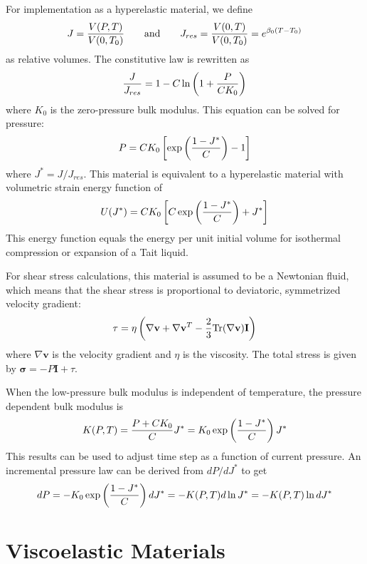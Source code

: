 \documentclass[11pt]{book}
\begin{document}
For implementation as a hyperelastic material, we define
\begin{equation}
 J = {V(P,T)\over V(0,T_0)} \qquad {\rm and} \qquad J_{res} = {V(0,T)\over V(0,T_0)} = e^{\beta_0(T-T_0)}
\end{equation}
as relative volumes. The constitutive law is rewritten as
\begin{equation}
     {J\over J_{res}} = 1-C\ln\left(1+{P\over CK_0}\right)
\end{equation}
where $K_0$ is the zero-pressure bulk modulus. This equation can be solved for pressure:
\begin{equation}
    P = CK_0\left[\exp\left(1 - J^*\over C\right)-1\right]
\end{equation}
where $J^*=J/J_{res}$. This material is equivalent to a hyperelastic material with volumetric strain energy function of
\begin{equation}
        U(J^*) = C K_0\left[ C \exp\left({1-J^*\over C}\right) + J^*\right]
\end{equation}
This energy function equals the energy per unit initial volume for isothermal compression or expansion of a Tait liquid.

For shear stress calculations, this material is assumed to be a Newtonian fluid, which means that the shear stress is proportional to deviatoric, symmetrized velocity gradient:
\begin{equation}
    \tau = \eta \left(\nabla \mathbf{v} + \nabla \mathbf{v}^T - {2\over 3}{\rm Tr}(\nabla \mathbf{v})\mathbf{I}\right)
\end{equation}
where $\nabla \mathbf{v}$ is the velocity gradient and $\eta$ is the viscosity. The total stress is given by $ \mathbf{\sigma} = -P \mathbf{I}  + \tau$.

When the low-pressure bulk modulus is independent of temperature, the pressure dependent bulk modulus is
\begin{equation}
       K(P,T) = {P+CK_0\over C} J^* = K_0\exp\left(1 - J^*\over C\right) J^*
\end{equation}
This results can be used to adjust time step as a function of current pressure. An incremental pressure law can be derived from $dP/dJ^*$ to get
\begin{equation}
       dP = -K_0\exp\left(1 - J^*\over C\right)dJ^* = -K(P,T) d\ln J^* = -K(P,T) \ln dJ^*
\end{equation}


\chapter{Viscoelastic Materials}
\end{document}
